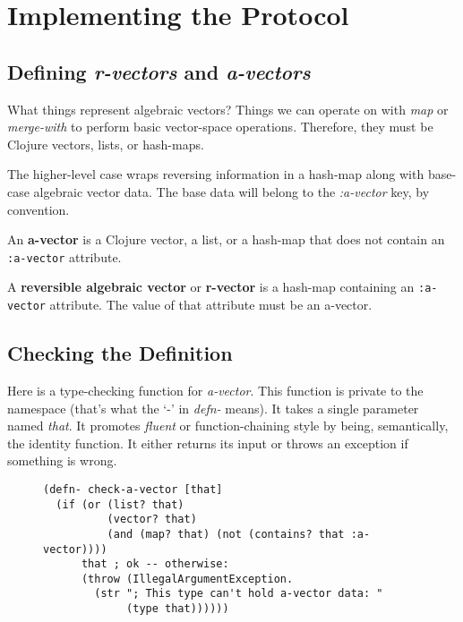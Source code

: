 \documentclass[11pt]{article}
\begin{document}
\section{Implementing the Protocol}
\label{sec-4}

\subsection{Defining \emph{r-vectors} and \emph{a-vectors}}
\label{sec-4-1}

What things represent algebraic vectors?  Things we can operate on
with \emph{map} or \emph{merge-with} to perform basic vector-space operations.
Therefore, they must be Clojure vectors, lists, or hash-maps.

The higher-level case wraps reversing information in a hash-map along
with base-case algebraic vector data. The base data will belong to
the \emph{\mbox{:a-vector}} key, by convention.


\begin{mydefinition}
   An \textbf{a-vector} is a Clojure vector, a list, or a hash-map that does not
   contain an \mbox{\texttt{:a-vector}} attribute.
\end{mydefinition}

\begin{mydefinition}
   A \textbf{reversible algebraic vector} or \textbf{r-vector} is a
   hash-map containing an \texttt{:a-vector} attribute. The value of
   that attribute must be an a-vector.
\end{mydefinition}
\subsection{Checking the Definition}
\label{sec-4-2}

Here is a type-checking function for \emph{a-vector}. This function is
private to the namespace (that's what the `-' in \emph{defn-} means).  It
takes a single parameter named \emph{that}. It promotes \emph{fluent} or
function-chaining style by being, semantically, the identity
function. It either returns its input or throws an exception if
something is wrong.

\begin{figure}[H]
\label{check-a-vector}
\begin{verbatim}
(defn- check-a-vector [that]
  (if (or (list? that)
          (vector? that)
          (and (map? that) (not (contains? that :a-vector))))
      that ; ok -- otherwise:
      (throw (IllegalArgumentException.
        (str "; This type can't hold a-vector data: "
             (type that))))))
\end{verbatim}
\end{figure}
\end{document}
